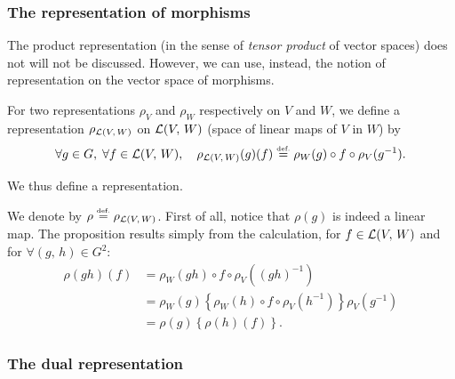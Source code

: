 \subsubsection{The representation of morphisms}
\label{sect3-representation-morphisms}
 
    The product representation (in the sense of \textit{tensor product} of vector spaces) does not will not be discussed. However, we can use, instead, the notion of representation on the vector space of morphisms.
 
\begin{defn}
\label{notation-75} \label{notation-76} For two representations $ \rho_V $ and $ \rho_W $ respectively on $V$ and $ W $, we define a representation $ \rho_{\mathcal{L} (V, \, W)} $ on $ \mathcal{L} (V, \, W) $ (space of linear maps of $V$ in $ W $) by
\begin{equation*}
\forall g \in G, \; \forall f \in \mathcal{L} (V, \, W), \quad \rho_{\mathcal{L} (V, \, W)} (g) (f) \stackrel{\mbox{\upshape\tiny def.}}{=} \rho_W (g) \circ f \circ \rho_V (g^{-1}).
\end{equation*}
\end{defn}
 
 
\begin{prop}
We thus define a representation.
\end{prop}
\begin{proofnoqed}
We denote by $ \rho \stackrel{\mbox{\upshape\tiny def.}}{=} \rho_{\mathcal{L} (V, \, W)} $. First of all, notice that $ \rho (g) $ is indeed a linear map. The proposition results simply from the calculation, for $ f \in \mathcal{L} (V, \, W) $ and for $ \forall (g, \, h) \in G^2 $:
\begin{align*}
\rho (gh) (f) & = \rho_W (gh) \circ f \circ \rho_V ((gh)^{-1}) \\
& = \rho_W (g) \left\{\rho_W (h) \circ f \circ \rho_V (h^{-1}) \right\} \rho_V (g^{-1}) \\
& = \rho (g) \left\{\rho (h) (f) \right\}. \tag *{\qed}
\end{align*}
\end{proofnoqed}
 
\subsubsection{The dual representation}
\label{sect3-dual-representation}
 
